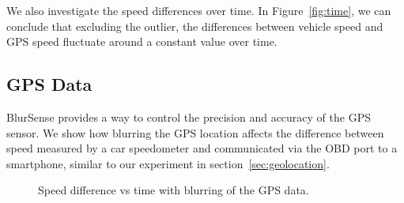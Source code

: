 We also investigate the speed differences over time. 
In Figure~\ref{fig:time}, we can conclude that excluding the outlier, 
the differences between 
vehicle speed and GPS speed fluctuate around a constant value over 
time. 

\subsection{GPS Data}

BlurSense provides a way to control the precision and accuracy of the GPS
sensor.  We show how blurring the GPS location affects the difference between
speed measured by a car speedometer and communicated via the OBD port to
a smartphone, similar to our experiment in section~\ref{sec:geolocation}.

\begin{figure}
\centering
\caption{Speed difference vs time with blurring of the GPS data.}
\label{fig:blur-GPS}
\end{figure}


